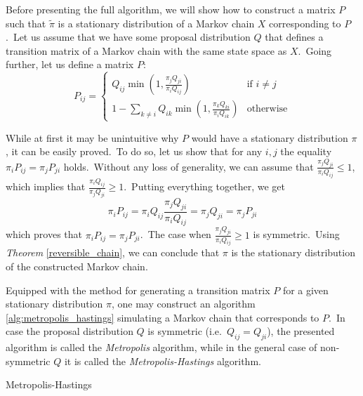 \documentclass[shortabstract, english, lic]{iithesis}
\theoremstyle{default_theorem_style}\newtheorem{theorem}{Theorem}
\theoremstyle{default_theorem_style}\newtheorem{definition}{Definition}
\begin{document}
\noindent Before presenting the full algorithm, we will show how to construct a matrix $P$ such that $\tilde{\pi}$ is a
stationary distribution of a Markov chain $X$ corresponding to $P$.\ Let us assume that we have some proposal
distribution $Q$ that defines a transition matrix of a Markov chain with the same state space as $X$.\ Going further,
let us define a matrix $P$:\newline
$$
P_{ij} =
\begin{cases}
  Q_{ij}\min{(1, \frac{\pi_j Q_{ji}}{\pi_i Q_{ij}})} &\text{if $i \ne j$}\\
  1 - \sum\limits_{k \ne i}Q_{ik} \min{(1, \frac{\pi_k Q_{ki}}{\pi_i Q_{ik}})} &\text{otherwise}
\end{cases}
$$

\noindent While at first it may be unintuitive why $P$ would have a stationary distribution $\pi$, it can be easily
proved.\ To do so, let us show that for any $i, j$ the equality $\pi_i P_{ij} = \pi_j P_{ji}$ holds.\ Without
any loss of generality, we can assume that $\frac{\pi_j Q_{ji}}{\pi_i Q_{ij}} \leq 1$, which implies that
$\frac{\pi_i Q_{ij}}{\pi_j Q_{ji}} \geq 1$.\ Putting everything together, we get
$$
\pi_i P_{ij} = \pi_i Q_{ij} \frac{\pi_j Q_{ji}}{\pi_i Q_{ij}} = \pi_j Q_{ji} = \pi_j P_{ji}
$$
which proves that $\pi_i P_{ij} = \pi_j P_{ji}$.\ The case when $\frac{\pi_j Q_{ji}}{\pi_i Q_{ij}} \geq 1$ is
symmetric.\ Using \textit{Theorem} \ref{reversible_chain}, we can conclude that $\pi$ is the stationary distribution
of the constructed Markov chain.\newline

\noindent Equipped with the method for generating a transition matrix $P$ for a given stationary distribution $\pi$,
one may construct an algorithm \ref{alg:metropolis_hastings} simulating a Markov chain that corresponds to $P$.\ In
case the proposal distribution $Q$ is symmetric (i.e.\ $Q_{ij} = Q_{ji}$), the presented algorithm is called the
\textit{Metropolis} algorithm, while in the general case of non-symmetric $Q$ it is called the
\textit{Metropolis-Hastings} algorithm.


\begin{algorithm}[tb]
\caption{Metropolis-Hastings}\label{alg:metropolis_hastings}
\begin{algorithmic}[1]
\Else
\EndIf
{}
\end{algorithmic}
\end{algorithm}
\end{document}

